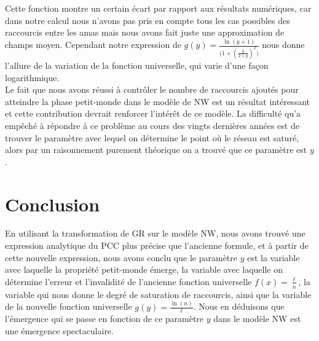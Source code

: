Cette fonction montre un certain écart par rapport aux résultats numériques, car dans notre calcul nous n'avons pas pris en compte tous les cas possibles des raccourcis entre les \textsf{amas} mais nous avons fait juste une approximation de champs moyen. Cependant notre
expression de $g(y)=\frac{\ln(y+1)}{\big(1+(\frac{y}{2+y})^2\big)}$ nous donne l'allure de la variation de la fonction universelle, qui varie d'une façon logarithmique.\\
Le fait que nous avons réussi à contrôler le nombre de raccourcis ajoutés pour atteindre la phase petit-monde dans le modèle de NW est un résultat intéressant et cette contribution devrait renforcer l'intérêt de ce modèle. La difficulté qu'a empêché à répondre à ce problème  au cours des vingts dernières années est de trouver le paramètre avec lequel on détermine le point où le réseau est saturé, alors par un raisonnement purement théorique on a trouvé que ce paramètre est $y$. 
\section{Conclusion}

En utilisant la transformation de GR sur le modèle NW, nous avons trouvé une expression analytique du PCC plus précise que l'ancienne formule, et à partir de cette nouvelle expression, nous avons conclu  que le paramètre $y$ est la variable avec laquelle la propriété petit-monde émerge, la variable avec laquelle on détermine  l'erreur et l'invalidité de l'ancienne fonction universelle $f(x)=\frac{\ell}{\acute{n}}$, la variable qui nous donne le degré de saturation de raccourcis, ainsi que la variable de la nouvelle fonction universelle $g(y)=\frac{\ln(n)}{\ell}$. Nous en déduisons que l'émergence qui se passe en fonction de ce paramètre $y$ dans le modèle NW est une émergence spectaculaire.